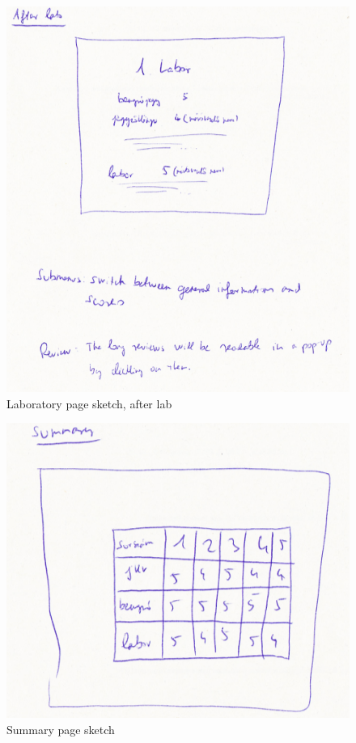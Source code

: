 \begin{figure}[!ht]
	\includegraphics[width=\textwidth]{figures/sketch4.png}
	\caption{Laboratory page sketch, after lab}
	\label{fig:sketch4}
\end{figure}

\begin{figure}[!ht]
	\includegraphics[width=\textwidth]{figures/sketch2.png}
	\caption{Summary page sketch}
	\label{fig:sketch2}
\end{figure}

